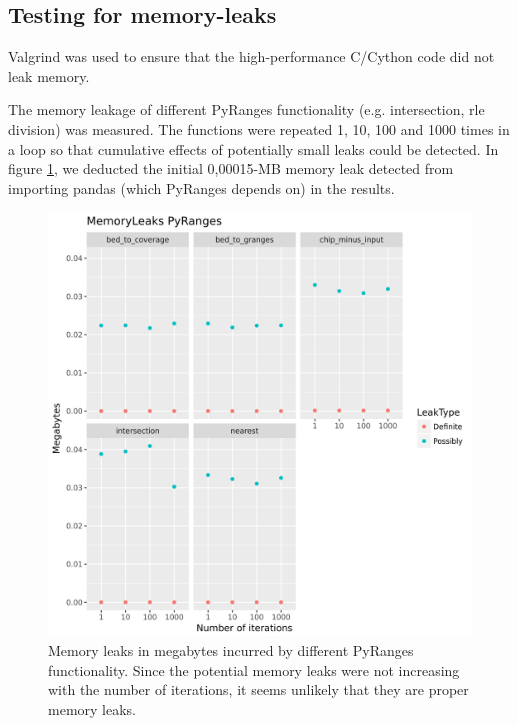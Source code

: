 \documentclass[10pt,letterpaper]{article}
\begin{document}
\subsection*{Testing for memory-leaks}

Valgrind \cite{Nethercote:2007:SBM:1254810.1254820} was used to ensure that the
high-performance C/Cython code did not leak memory.

The memory leakage of different PyRanges functionality (e.g. intersection, rle
division) was measured. The functions were repeated 1, 10, 100 and 1000 times in
a loop so that cumulative effects of potentially small leaks could be detected.
In figure \ref{fig1}, we deducted the initial 0,00015-MB memory leak detected
from importing pandas (which PyRanges depends on) in the results.

\begin{figure}
\includegraphics[width=1\textwidth]{graphs/memleak.png}
\caption{Memory leaks in megabytes incurred by different PyRanges functionality.
  Since the potential memory leaks were not increasing with the number of
  iterations, it seems unlikely that they are proper memory
  leaks.} %
\label{fig1} %
\end{figure} %
\end{document}
